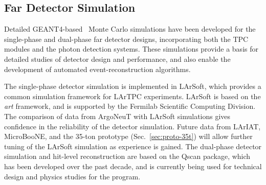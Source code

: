 \subsection{Far Detector Simulation}
\label{sec:detectors-sc-physics-software-simulation-fd}

Detailed GEANT4-based~\cite{GEANT4:NIM,GEANT4} Monte Carlo simulations
have been developed for the single-phase and dual-phase far detector
designs, incorporating both the TPC modules and the photon detection
systems. These simulations provide a basis for detailed studies of
detector design and performance, and also enable the development of
automated event-reconstruction algorithms.

The single-phase detector simulation is implemented in
LArSoft\cite{Church:2013hea}, which provides a common simulation
framework for LArTPC experiments.  LArSoft is based on the {\it art}
framework\cite{Green:2012gv}, and is supported by the Fermilab
Scientific Computing Division.  The comparison of data from
ArgoNeuT\cite{Anderson:2012vc,Anderson:2012mra} with LArSoft
simulations gives confidence in the reliability of the detector
simulation.  Future data from
LArIAT\cite{Adamson:2013/02/28tla,Cavanna:2014iqa},
MicroBooNE\cite{Chen:2007ae,Jones:2011ci,microboonecdr}, and the
35-ton prototype (Sec.~\ref{sec:proto-35t}) will allow further tuning
of the LArSoft simulation as experience is gained.  The dual-phase
detector simulation and hit-level reconstruction are based on the
Qscan\cite{lussi:thesis} package, which has been developed over the
past decade, and is currently being used for technical design and
physics studies for the \cerndualproto{} program.

